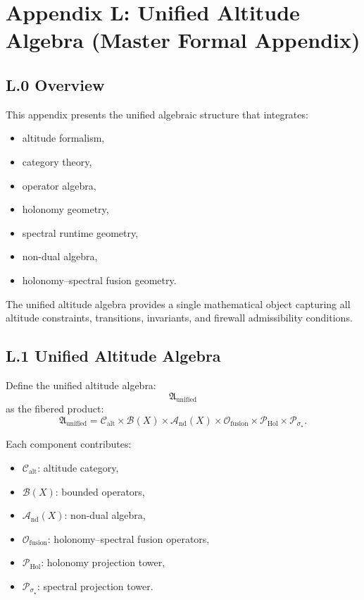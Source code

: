 \appendix
\section*{Appendix L: Unified Altitude Algebra (Master Formal Appendix)}

\subsection*{L.0 Overview}

This appendix presents the unified algebraic structure that integrates:
\begin{itemize}
    \item altitude formalism,
    \item category theory,
    \item operator algebra,
    \item holonomy geometry,
    \item spectral runtime geometry,
    \item non-dual algebra,
    \item holonomy–spectral fusion geometry.
\end{itemize}

The unified altitude algebra provides a single mathematical object
capturing all altitude constraints, transitions, invariants, and
firewall admissibility conditions.

\subsection*{L.1 Unified Altitude Algebra}

Define the unified altitude algebra:
\[
\mathfrak{A}_{\mathrm{unified}}
\]
as the fibered product:
\[
\mathfrak{A}_{\mathrm{unified}}
=
\mathcal{C}_{\mathrm{alt}}
\times
\mathcal{B}(X)
\times
\mathcal{A}_{\mathrm{nd}}(X)
\times
\mathcal{O}_{\mathrm{fusion}}
\times
\mathcal{P}_{\mathrm{Hol}}
\times
\mathcal{P}_{\sigma_{\star}}.
\]

Each component contributes:
\begin{itemize}
    \item $\mathcal{C}_{\mathrm{alt}}$: altitude category,
    \item $\mathcal{B}(X)$: bounded operators,
    \item $\mathcal{A}_{\mathrm{nd}}(X)$: non-dual algebra,
    \item $\mathcal{O}_{\mathrm{fusion}}$: holonomy–spectral fusion operators,
    \item $\mathcal{P}_{\mathrm{Hol}}$: holonomy projection tower,
    \item $\mathcal{P}_{\sigma_{\star}}$: spectral projection tower.
\end{itemize}

